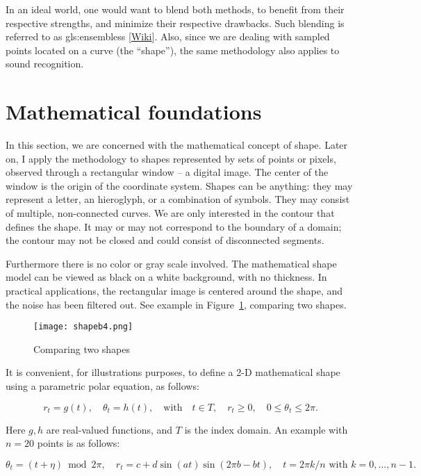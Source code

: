 \documentclass[oneside,10pt]{book}
\begin{document}
In an ideal world, one would want to blend both methods, to benefit from their respective strengths, and minimize their respective drawbacks. Such blending is referred to as \glspl{gls:ensembles} [\href{https://en.wikipedia.org/wiki/Ensemble_learning}{Wiki}]. Also, since we are dealing with sampled points located on a curve (the “shape”), the same methodology also applies to sound recognition.

\section{Mathematical foundations}

In this section, we are concerned with the mathematical concept of shape. Later on, I apply the methodology to shapes represented by sets of points or pixels, observed through a rectangular window -- a digital image. The center of the window is the origin of the coordinate system. Shapes can be anything: they may represent a letter, an hieroglyph, or a combination of symbols. They may consist of multiple, non-connected curves. We are only interested in the contour that defines the shape. It may or may not correspond to the boundary of a domain; the contour may not be closed and could consist of disconnected segments.

Furthermore there is no color or gray scale involved. The mathematical shape model can be viewed as black on a white background, with no thickness. In practical applications, the rectangular image is centered around the shape, and the noise has been filtered out. See example in Figure~\ref{fig:dash}, comparing two shapes.

\begin{figure}%
\centering
\texttt{[image: shapeb4.png]} %
\caption{Comparing two shapes}
\label{fig:dash}
\end{figure}


\noindent It is convenient, for illustrations purposes, to define a 2-D mathematical shape using a parametric polar equation, as follows:

$$r_t =g(t), \quad\theta_t=h(t),  \quad \text{with}\quad  t\in T, \quad r_t\geq 0, \quad 0\leq \theta_t\leq 2\pi.$$

\noindent Here $g, h$ are real-valued functions, and $T$ is the index domain. An example with $n= 20$ points is as follows:

\begin{equation}
\theta_t=(t+\eta)\bmod{2\pi},\quad r_t=c+d \sin(at) \sin(2\pi b- bt), \quad t = 2\pi k/n \text{ with } k=0,\dots, n-1. \label{eq2}
\end{equation}
\end{document}
